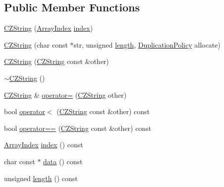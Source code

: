 \subsection*{Public Member Functions}
\begin{DoxyCompactItemize}
\item 
\hyperlink{class_json_1_1_value_1_1_c_z_string_a4b8aa6eaabdec78cffec96e088da996f}{C\+Z\+String} (\hyperlink{class_json_1_1_value_a184a91566cccca7b819240f0d5561c7d}{Array\+Index} \hyperlink{class_json_1_1_value_1_1_c_z_string_a0f3ba09401525d4f01dafd577122ee32}{index})
\item 
\hyperlink{class_json_1_1_value_1_1_c_z_string_a86a86eaf0cf26d4c861d0daa359d608a}{C\+Z\+String} (char const $\ast$str, unsigned \hyperlink{class_json_1_1_value_1_1_c_z_string_aa7ee665d162c1f33b3ec818e289d8a5e}{length}, \hyperlink{class_json_1_1_value_1_1_c_z_string_a2805c46fb4a72bbaed55de6d75941b6d}{Duplication\+Policy} allocate)
\item 
\hyperlink{class_json_1_1_value_1_1_c_z_string_a9685070d440335b55ef5c85747d25157}{C\+Z\+String} (\hyperlink{class_json_1_1_value_1_1_c_z_string}{C\+Z\+String} const \&other)
\item 
\hyperlink{class_json_1_1_value_1_1_c_z_string_add6989dc7073646b95e5ebacb3f07d51}{$\sim$\+C\+Z\+String} ()
\item 
\hyperlink{class_json_1_1_value_1_1_c_z_string}{C\+Z\+String} \& \hyperlink{class_json_1_1_value_1_1_c_z_string_a6513ff431b0593d5744868dfee739f7b}{operator=} (\hyperlink{class_json_1_1_value_1_1_c_z_string}{C\+Z\+String} other)
\item 
bool \hyperlink{class_json_1_1_value_1_1_c_z_string_ae023bb91b4b4520c82d5e6e4da8c310a}{operator$<$} (\hyperlink{class_json_1_1_value_1_1_c_z_string}{C\+Z\+String} const \&other) const
\item 
bool \hyperlink{class_json_1_1_value_1_1_c_z_string_ad41766c98fc6a6d5fcd72aaf78fc5db0}{operator==} (\hyperlink{class_json_1_1_value_1_1_c_z_string}{C\+Z\+String} const \&other) const
\item 
\hyperlink{class_json_1_1_value_a184a91566cccca7b819240f0d5561c7d}{Array\+Index} \hyperlink{class_json_1_1_value_1_1_c_z_string_a0f3ba09401525d4f01dafd577122ee32}{index} () const
\item 
char const  $\ast$ \hyperlink{class_json_1_1_value_1_1_c_z_string_af6eee54f8dc43a1203d5af6ba0a5c9a2}{data} () const
\item 
unsigned \hyperlink{class_json_1_1_value_1_1_c_z_string_aa7ee665d162c1f33b3ec818e289d8a5e}{length} () const

\end{DoxyCompactItemize}
